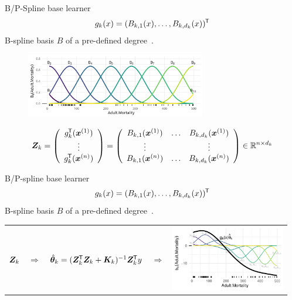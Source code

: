 \documentclass[t,10pt]{beamer}
\newcommand{\penMat}{\bm{K}}
\begin{document}
\begin{frame}{B/P-Spline base learner}
  \vspace{-0.3cm}\[g_k(x) = (B_{k,1}(x), \dots, B_{k,d_k}(x))^\tran\] B-spline basis $B$ of a pre-defined degree~\citep{eilers1996flexible}.
  \begin{center}
    \begin{figure}
      \includegraphics[width=0.7\textwidth]{figures/bs-base/fig-bs0.png}
    \end{figure}
    \vspace{-0.3cm}
    \[
    \design_k = \left(\begin{array}{c}
      g_{k}^\tran(\xi[1]) \\
      \vdots \\
      g_{k}^\tran(\xi[n])
    \end{array}\right) = \left(\begin{array}{ccc}
      B_{k,1}(\xi[1]) & \dots & B_{k,d_k}(\xi[1]) \\
      \vdots &  & \vdots \\
      B_{k,1}(\xi[n]) & \dots & B_{k,d_k}(\xi[n])
    \end{array}\right)\in\R^{n\times d_k}
    \]
  \end{center}
\end{frame}



\begin{frame}{B/P-spline base learner}
  \vspace{-0.3cm}\[g_k(x) = (B_{k,1}(x), \dots, B_{k,d_k}(x))^\tran\] B-spline basis $B$ of a pre-defined degree~\citep{eilers1996flexible}.
\begin{center}
    \begin{tabular}{ccccc}
         $\design_k$ & $\Rightarrow$ & $\tbh_k = (\design_k^\tran \design_k + \penMat_k)^{-1}\design_k^\tran y$ & $\Rightarrow$ & \includegraphics[align=c,width=5cm]{figures/bs-estimated.pdf}
    \end{tabular}
\end{center}

\end{frame}
\end{document}
